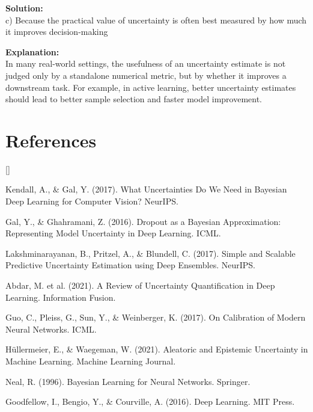 \documentclass{article}
\def\beginrefs{\begin{list}
        {[\arabic{equation}]}{\usecounter{equation}
         \setlength{\leftmargin}{2.0truecm}\setlength{\labelsep}{0.4truecm}%
         \setlength{\labelwidth}{1.6truecm}}}
\def\endrefs{\end{list}}
\def\bibentry#1{\item[\hbox{[#1]}]}
\begin{document}
\begin{enumerate}
\textbf{Solution:} \\
c) Because the practical value of uncertainty is often best measured by how much it improves decision-making

\textbf{Explanation:} \\
In many real-world settings, the usefulness of an uncertainty estimate is not judged only by a standalone numerical metric, but by whether it improves a downstream task. For example, in active learning, better uncertainty estimates should lead to better sample selection and faster model improvement.

\end{enumerate}

\section{References}

\beginrefs

\bibentry{1}
Kendall, A., \& Gal, Y. (2017).
What Uncertainties Do We Need in Bayesian Deep Learning for Computer Vision?
NeurIPS.

\bibentry{2}
Gal, Y., \& Ghahramani, Z. (2016).
Dropout as a Bayesian Approximation: Representing Model Uncertainty in Deep Learning.
ICML.

\bibentry{3}
Lakshminarayanan, B., Pritzel, A., \& Blundell, C. (2017).
Simple and Scalable Predictive Uncertainty Estimation using Deep Ensembles.
NeurIPS.

\bibentry{4}
Abdar, M. et al. (2021).
A Review of Uncertainty Quantification in Deep Learning.
Information Fusion.

\bibentry{5}
Guo, C., Pleiss, G., Sun, Y., \& Weinberger, K. (2017).
On Calibration of Modern Neural Networks.
ICML.

\bibentry{6}
Hüllermeier, E., \& Waegeman, W. (2021).
Aleatoric and Epistemic Uncertainty in Machine Learning.
Machine Learning Journal.

\bibentry{7}
Neal, R. (1996).
Bayesian Learning for Neural Networks.
Springer.

\bibentry{8}
Goodfellow, I., Bengio, Y., \& Courville, A. (2016).
Deep Learning.
MIT Press.

\endrefs
\end{document}
